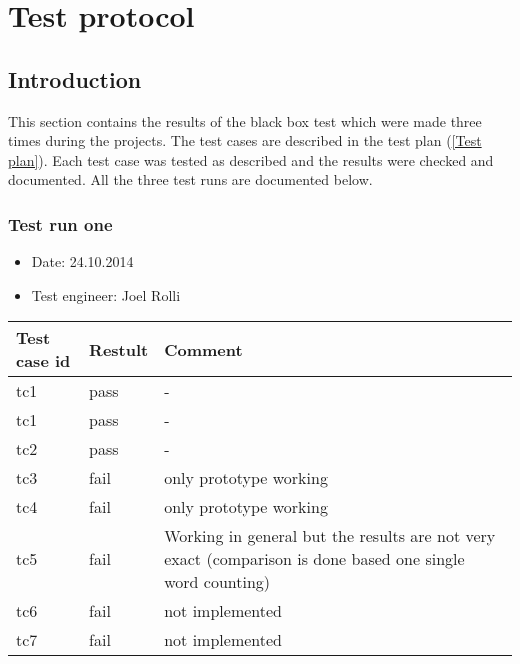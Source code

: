 \chapter{Test protocol} %

\label{Test protocol} %



\section{Introduction}

This section contains the results of the black box test which were made three times during the projects. The test cases are described in the test plan (\ref{Test plan}). Each test case was tested as described and the results were checked and documented. All the three test runs are documented below.

	\subsection{Test run one}

	\begin{itemize}
	\item Date: 24.10.2014
	\item Test engineer: Joel Rolli 
	\end{itemize}	


	\begin{tabular}{ | p{3cm} | p{2cm} | p{7cm} |}
	\hline
	\textbf{Test case id} 					& \textbf{Restult} & \textbf{Comment} 		\\ 	\hline
	tc1 & pass & - \\ \hline	
	tc1 & pass & - \\ \hline	
	tc2 & pass & - \\ \hline	
	tc3 & fail & only prototype working \\ \hline	
	tc4 & fail & only prototype working \\ \hline	
	tc5 & fail & Working in general but the results are not very exact (comparison is done based one single word counting) \\ \hline	
	tc6 & fail & not implemented \\ \hline	
	tc7 & fail & not implemented \\ \hline	
	\end{tabular} \\


